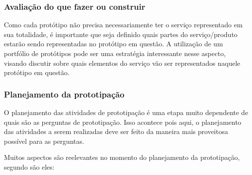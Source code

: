 \subsubsection{Avaliação do que fazer ou construir}

Como cada protótipo não precisa necessariamente ter o serviço representado em sua totalidade, é importante que seja definido quais partes do serviço/produto estarão sendo representadas no protótipo em questão. A utilização de um portfólio de protótipos pode ser uma estratégia interessante nesse aspecto, visando discutir sobre quais elementos do serviço vão ser representados naquele protótipo em questão.

\subsubsection{Planejamento da prototipação}

O planejamento das atividades de prototipação é uma etapa muito dependente de quais são as perguntas de prototipação. Isso acontece pois aqui, o planejamento das atividades a serem realizadas deve ser feito da maneira mais proveitosa possível para as perguntas.

Muitos aspectos são reelevantes no momento do planejamento da prototipação, segundo \cite{Stickdorn2019} são eles: 

